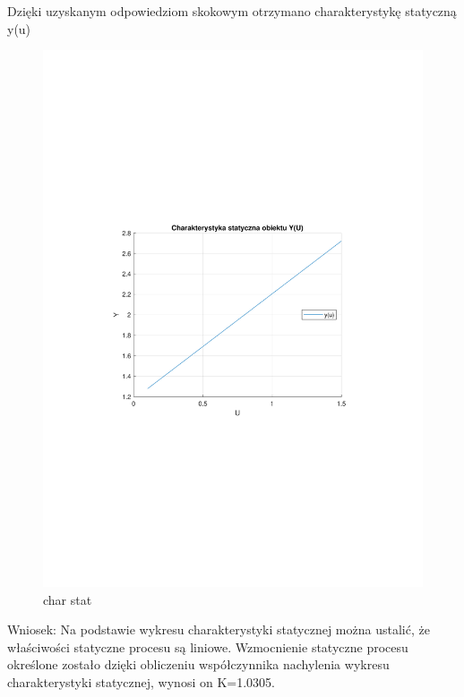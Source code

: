 Dzięki uzyskanym odpowiedziom skokowym otrzymano charakterystykę statyczną y(u)
\begin{figure}[H]
    \centering
    \includegraphics[scale=0.8]{../projekt/zad2/Dane/char_stat.pdf}
    \caption{char stat}
\end{figure}

Wniosek: 
Na podstawie wykresu charakterystyki statycznej można ustalić, 
że właściwości statyczne procesu są liniowe. 
Wzmocnienie statyczne procesu określone zostało dzięki obliczeniu współczynnika nachylenia 
wykresu charakterystyki statycznej, wynosi on K=1.0305.
